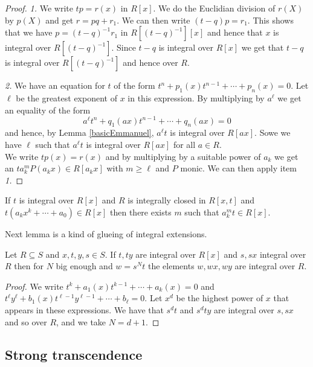 \documentclass[11pt,a4paper,twoside]{article}
\begin{document}
\begin{proof}
\emph{1.} We write $tp = r(x)$ in $R[x]$. We do the Euclidian division of $r(X)$
by $p(X)$ and get $r = pq + r_1$. We can then write $(t-q)p = r_1$. This
shows that we have $p = (t-q)^{-1}r_1$ in $R[(t-q)^{-1}][x]$ and hence
that $x$ is integral over $R[(t-q)^{-1}]$. Since $t-q$ is integral over $R[x]$
we get that $t-q$ is integral over $R[(t-q)^{-1}]$ and hence over $R$.

\noindent 
\emph{2.} We have an equation for $t$ of the form $t^n +p_1(x)t^{n-1}+ \cdots+p_n(x) = 0$.
Let $\ell $ be the greatest exponent of $x$ in this expression. By multiplying by
$a^\ell $ we get an equality of the form
$$
a^\ell  t^n + q_1(ax) t^{n-1} + \cdots + q_n(ax) = 0
$$
and hence, by Lemma \ref{basicEmmanuel}, $a^\ell t$ is integral over $R[ax]$.
Sowe we have $\ell$ such that $a^\ell t$ is integral over $R[ax]$ for all $a\in R$.
\\
We write $tp(x) = r(x)$ and by multiplying by a suitable power of $a_k$ we get an 
$ta_k^m P(a_k x) \in R[a_k x]$ with $m\geq \ell$ and $P$ monic. We
can then apply item \emph{1.}
\end{proof}

\begin{corollary}\label{corvarcomp}
If $t$ is integral over $R[x]$ and $R$ is integrally closed in $R[x,t]$ and
$t(a_kx^k+ \cdots+a_0) \in R[x]$ then there exists $m$ such that $a_k^mt\in R[x]$.
\end{corollary}

Next lemma is a kind of glueing of integral extensions.

\begin{lemma}\label{int}
Let $R\subseteq S$ and $x,t,y,s\in S$. If $t,ty$ are integral over $R[x]$ and $s,sx$ integral over $R$ then for $N$
big enough and $w=s^Nt$ the elements $w,wx,wy$ are integral over $R$.
\end{lemma}

\begin{proof}
We write $t^k + a_1(x)t^{k-1} + \cdots + a_k(x) = 0$ and
$t^\ell y^\ell  + b_1(x) t^{\ell -1}y^{\ell -1} + \cdots + b_\ell  = 0$. Let $x^d$ be the highest
power of $x$ that appears in these expressions. We have that $s^dt$ and
$s^dty$ are integral over $s,sx$ and so over $R$, and we take $N=d+1$.
\end{proof}


\subsection{Strong transcendence}\label{secstrongtrans}
\end{document}
